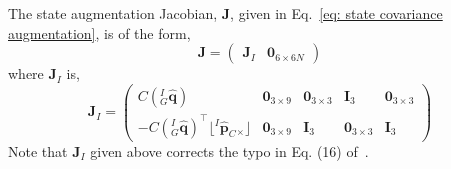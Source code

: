 \section{}
\label{sec: state augmentation jacobian}
The state augmentation Jacobian, $\mathbf{J}$, given in Eq.~\eqref{eq: state covariance augmentation}, is of the form,
\begin{equation*}
\mathbf{J} = 
\begin{pmatrix}
\mathbf{J}_I & \mathbf{0}_{6\times 6N}
\end{pmatrix}
\end{equation*}
where $\mathbf{J}_I$ is,
\begin{equation*}
\mathbf{J}_I = 
\begin{pmatrix}
C\left({}^I_G\hat{\mathbf{q}}\right) & \mathbf{0}_{3\times 9} & 
\mathbf{0}_{3\times 3} & \mathbf{I}_3 & \mathbf{0}_{3\times 3} \\
-C\left({}^I_G\hat{\mathbf{q}}\right)^\top \lfloor{}^I\hat{\mathbf{p}}_C {}_{\times}\rfloor & 
\mathbf{0}_{3\times 9} & \mathbf{I}_3 & \mathbf{0}_{3\times 3} & 
\mathbf{I}_{3}
\end{pmatrix}
\end{equation*}
Note that $\mathbf{J}_I$ given above corrects the typo in Eq. (16) of~\cite{mourikis2007multi}. 

